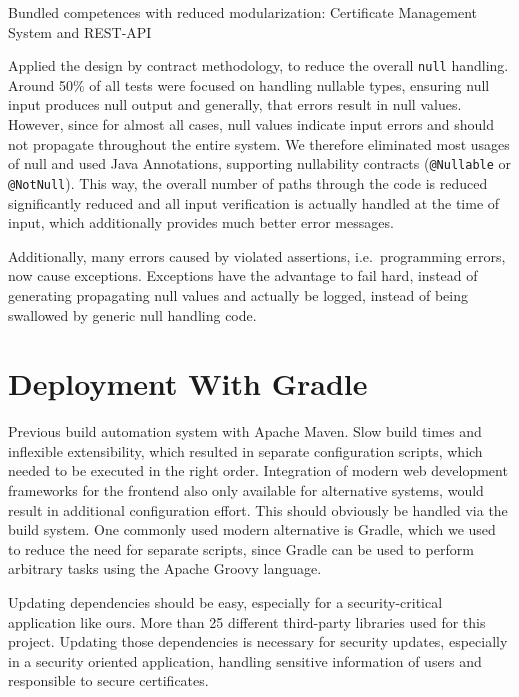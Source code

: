 Bundled competences with reduced modularization: Certificate Management System and REST-API

Applied the design by contract methodology, to reduce the overall \lstinline{null} handling.
Around 50\% of all tests were focused on handling nullable types, ensuring null input produces null output and
generally, that errors result in null values.
However, since for almost all cases, null values indicate input errors and should not propagate throughout the entire
system.
We therefore eliminated most usages of null and used Java Annotations, supporting nullability contracts
(\lstinline{@Nullable} or \lstinline{@NotNull}).
This way, the overall number of paths through the code is reduced significantly reduced and all input verification is
actually handled at the time of input, which additionally provides much better error messages.

Additionally, many errors caused by violated assertions, i.e.\ programming errors, now cause exceptions.
Exceptions have the advantage to fail hard, instead of generating propagating null values and actually be logged,
instead of being swallowed by generic null handling code.

\section{Deployment With Gradle}\label{sec:deploymentWithGradle}

Previous build automation system with Apache Maven.
Slow build times and inflexible extensibility, which resulted in separate configuration scripts, which needed to be
executed in the right order.
Integration of modern web development frameworks for the frontend also only available for alternative systems, would
result in additional configuration effort.
This should obviously be handled via the build system.
One commonly used modern alternative is Gradle, which we used to reduce the need for separate scripts, since Gradle can
be used to perform arbitrary tasks using the Apache Groovy language.

Updating dependencies should be easy, especially for a security-critical application like ours.
More than 25 different third-party libraries used for this project.
Updating those dependencies is necessary for security updates, especially in a security oriented application, handling
sensitive information of users and responsible to secure certificates.

